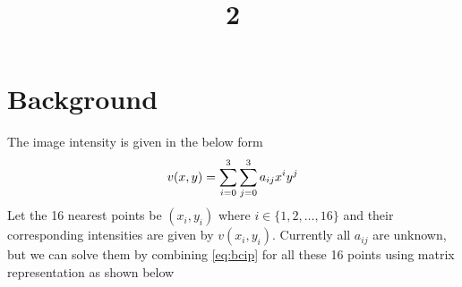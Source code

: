 \documentclass[a4paper, landscape]{article}
\title{2}
\date{}
\begin{document}
\maketitle
\section{Background}
The image intensity is given in the below form
\begin{equation}{\label{eq:bcip}}
		v(x,y)= \sum_{i=0}^{3}\sum_{j=0}^{3} a_{ij}x^i y^j
\end{equation}
Let the 16 nearest points be $(x_i, y_i)$ where $i\in\{1,2,\ldots,16\}$ and their corresponding intensities are given by $v(x_i, y_i)$.
Currently all $a_{ij}$ are unknown, but we can solve them by combining \ref{eq:bcip} for all these 16 points using matrix representation as shown below 
\end{document}
